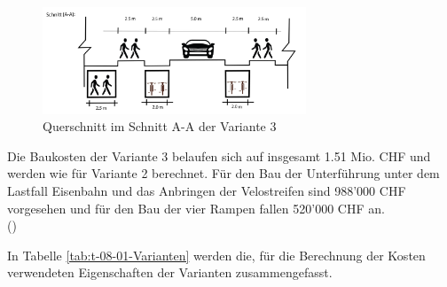 \begin{figure}[h!]
	\centering
	\includegraphics[width=0.7\textwidth]{figures/f-04-05-03-b-V3}
	\caption[Querschnitt Variante 3]{Querschnitt im Schnitt A-A der Variante 3}
	\label{img:V3Q}
\end{figure}

Die Baukosten der Variante 3 belaufen sich auf insgesamt 1.51 Mio. CHF und werden wie für Variante 2 berechnet. Für den Bau der Unterführung unter dem Lastfall Eisenbahn und das Anbringen der Velostreifen sind 988'000 CHF vorgesehen und für den Bau der vier Rampen fallen 520'000 CHF an. \\ (\cite{Baukosten2010}) 


In Tabelle \ref{tab:t-08-01-Varianten} werden die, für die Berechnung der Kosten verwendeten Eigenschaften der Varianten zusammengefasst.


\pagebreak

%

